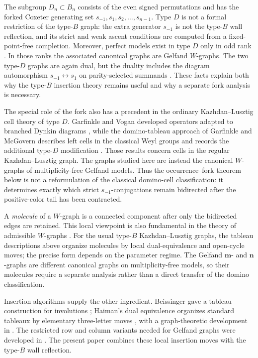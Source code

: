 \documentclass[11pt]{article}
\theoremstyle{definition}
\theoremstyle{remark}
\newcommand{\mgraph}{\mathbf m}
\newcommand{\ngraph}{\mathbf n}
\begin{document}
The subgroup $D_n\subset B_n$ consists of the even signed permutations
and has the forked Coxeter generating set
$s_{-1},s_1,s_2,\ldots,s_{n-1}$.  Type $D$ is not a formal restriction of
the type-$B$ graph: the extra generator $s_{-1}$ is not the type-$B$ wall
reflection, and its strict and weak ascent conditions are computed from a
fixed-point-free completion.  Moreover, perfect models exist in type $D$
only in odd rank \cite{MZPerfect}.  In those ranks the associated canonical
graphs are Gelfand $W$-graphs.  The two type-$D$ graphs are again dual, but
the duality includes the diagram automorphism $s_{-1}\leftrightarrow s_1$
on parity-selected summands \cite{MZGelfand}.  These facts explain both why
the type-$B$ insertion theory remains useful and why a separate fork
analysis is necessary.

The special role of the fork also has a precedent in the ordinary
Kazhdan--Lusztig cell theory of type $D$.  Garfinkle and Vogan developed
operators adapted to branched Dynkin diagrams \cite{GarfinkleVogan}, while
the domino-tableau approach of Garfinkle and McGovern describes left cells
in the classical Weyl groups and records the additional type-$D$
modification \cite{Garfinkle,McGovernDomino}.  Those results concern cells in
the regular Kazhdan--Lusztig graph.  The graphs studied here are instead the
canonical $W$-graphs of multiplicity-free Gelfand models.  Thus the
occurrence--fork theorem below is not a reformulation of the classical
domino-cell classification: it determines exactly which strict
$s_{-1}$-conjugations remain bidirected after the positive-color tail has
been contracted.

A \emph{molecule} of a $W$-graph is a connected component after only the
bidirected edges are retained.  This local viewpoint is also fundamental
in the theory of admissible $W$-graphs \cite{Stembridge}.  For the usual
type-$B$ Kazhdan--Lusztig graphs, the tableau descriptions above organize
molecules by local dual-equivalence and open-cycle moves; the precise
form depends on the parameter regime.  The Gelfand $\mgraph$- and
$\ngraph$-graphs are different canonical graphs on multiplicity-free
models, so their molecules require a separate analysis rather than a
direct transfer of the domino classification.

Insertion algorithms supply the other ingredient.  Beissinger gave a
tableau construction for involutions \cite{Beissinger}; Haiman's dual
equivalence organizes standard tableaux by elementary three-letter moves
\cite{Haiman}, with a graph-theoretic development in \cite{Assaf}.  The
restricted row and column variants needed for Gelfand graphs were
developed in \cite{MZInsertion}.  The present paper combines these local
insertion moves with the type-$B$ wall reflection.
\end{document}
